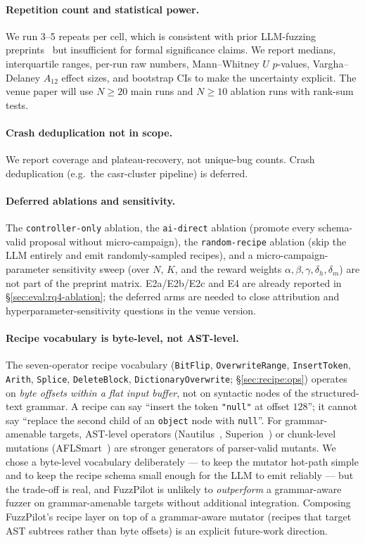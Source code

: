 \documentclass[11pt]{article}
\begin{document}
\paragraph{Repetition count and statistical power.}
We run 3--5 repeats per cell, which is consistent with prior LLM-fuzzing
preprints~\cite{wang2024llamafuzz,liu2025g2fuzz,lin2025hybrid} but
insufficient for formal significance claims. We report medians,
interquartile ranges, per-run raw numbers, Mann--Whitney $U$
$p$-values, Vargha--Delaney $A_{12}$ effect sizes, and bootstrap CIs
to make the uncertainty explicit. The venue paper will use
$N{\geq}20$ main runs and $N{\geq}10$ ablation runs with rank-sum
tests.

\paragraph{Crash deduplication not in scope.}
We report coverage and plateau-recovery, not unique-bug counts.
Crash deduplication (e.g.~the casr-cluster pipeline) is deferred.

\paragraph{Deferred ablations and sensitivity.}
The \texttt{controller-only} ablation, the \texttt{ai-direct}
ablation (promote every schema-valid proposal without
micro-campaign), the \texttt{random-recipe} ablation (skip the LLM
entirely and emit randomly-sampled recipes), and a
micro-campaign-parameter sensitivity sweep (over $N$, $K$, and the
reward weights $\alpha, \beta, \gamma, \delta_h, \delta_m$) are not
part of the preprint matrix. E2a/E2b/E2c and E4 are already reported
in \S\ref{sec:eval:rq4-ablation}; the deferred arms are needed to
close attribution and hyperparameter-sensitivity questions in the
venue version.

\paragraph{Recipe vocabulary is byte-level, not AST-level.}
The seven-operator recipe vocabulary
(\texttt{BitFlip}, \texttt{OverwriteRange}, \texttt{InsertToken},
\texttt{Arith}, \texttt{Splice}, \texttt{DeleteBlock},
\texttt{DictionaryOverwrite}; \S\ref{sec:recipe:ops}) operates on
\emph{byte offsets within a flat input buffer}, not on syntactic
nodes of the structured-text grammar. A recipe can say ``insert
the token \texttt{"null"} at offset $128$''; it cannot say
``replace the second child of an \texttt{object} node with
\texttt{null}''. For grammar-amenable targets, AST-level
operators (Nautilus~\cite{aschermann2019nautilus},
Superion~\cite{wang2019superion}) or chunk-level mutations
(AFLSmart~\cite{pham2019aflsmart}) are stronger generators of
parser-valid mutants. We chose a byte-level vocabulary
deliberately --- to keep the mutator hot-path simple and to keep
the recipe schema small enough for the LLM to emit reliably ---
but the trade-off is real, and FuzzPilot is unlikely to
\emph{outperform} a grammar-aware fuzzer on grammar-amenable
targets without additional integration. Composing FuzzPilot's
recipe layer on top of a grammar-aware mutator (recipes that
target AST subtrees rather than byte offsets) is an explicit
future-work direction.
\end{document}
